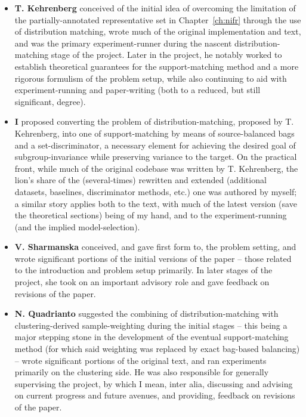 %
{\renewcommand\labelitemi{}
%
\begin{itemize}
  \item 
    \textbf{T. Kehrenberg} conceived of the initial idea of overcoming the limitation of the
    partially-annotated representative set in Chapter~\ref{ch:nifr} through the use of distribution
    matching, wrote much of the original implementation and text, and was the primary
    experiment-runner during the nascent distribution-matching stage of the project.
    Later in the project, he notably worked to establish theoretical guarantees for the
    support-matching method and a more rigorous formulism of the problem setup, while also
    continuing to aid with experiment-running and paper-writing (both to a reduced, but still
    significant, degree).
  \item 
    \textbf{I} proposed converting the problem of distribution-matching, proposed by T. Kehrenberg,
    into one of support-matching by means of source-balanced bags and a set-discriminator, a
    necessary element for achieving the desired goal of subgroup-invariance while preserving
    variance to the target.
    On the practical front, while much of the original codebase was written by T. Kehrenberg, the
    lion's share of the (several-times) rewritten and extended (additional datasets, baselines,
    discriminator methods, etc.) one was authored by myself; a similar story applies both to the
    text, with much of the latest version (save the theoretical sections) being of my hand, and to
    the experiment-running (and the implied model-selection).
  \item
    \textbf{V. Sharmanska} conceived, and gave first form to, the problem setting, and wrote
    significant portions of the initial versions of the paper -- those related to the introduction
    and problem setup primarily.
    In later stages of the project, she took on an important advisory role and gave feedback on
    revisions of the paper.
  \item 
    \textbf{N. Quadrianto} suggested the combining of distribution-matching with clustering-derived
    sample-weighting during the initial stages -- this being a major stepping stone in the
    development of the eventual support-matching method (for which said weighting was replaced by
    exact bag-based balancing) -- wrote significant portions of the original text, and ran
    experiments primarily on the clustering side.
    He was also responsible for generally supervising the project, by which I mean, inter alia,
    discussing and advising on current progress and future avenues, and providing, feedback on
    revisions of the paper.
\end{itemize}
%
}
